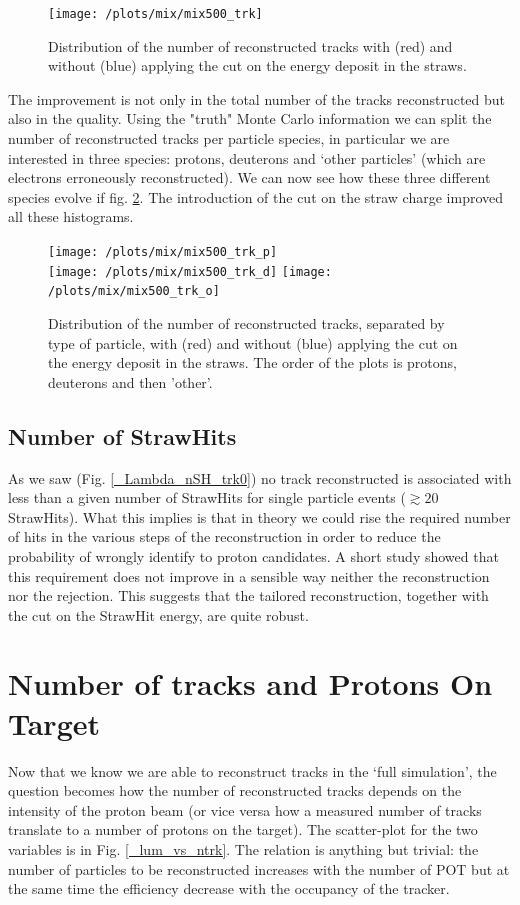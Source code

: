 \documentclass[12pt,a4paper,openright, oneside, titlepage]{book} %
\begin{document}
\begin{figure}[!htb]
\centering
\texttt{[image: /plots/mix/mix500\_trk]}
\caption[Number of tracks with and without the cut on the StrawHit energy]
{Distribution of the number of reconstructed tracks with (red) and without (blue) 
applying the cut on the energy deposit in the straws.}
\label{_mix_proton_trk}
\end{figure}

\noindent The improvement is not only in the total number of the tracks reconstructed but also in the quality. 
Using the "truth" Monte Carlo information we can split the number of reconstructed tracks per particle species, 
in particular we are interested in three species: protons, deuterons and `other particles' (which are electrons erroneously reconstructed).
We can now see how these three different species evolve if fig. \ref{_mix_pdgID_trk}.
The introduction of the cut on the straw charge improved all these histograms.

\begin{figure}[!htb]
\centering
\texttt{[image: /plots/mix/mix500\_trk\_p]}\\
\texttt{[image: /plots/mix/mix500\_trk\_d]}
\texttt{[image: /plots/mix/mix500\_trk\_o]}
\caption[Number of tracks from different particles]
{Distribution of the number of reconstructed tracks, separated by type of particle, with (red) and without (blue) applying the cut on the energy deposit in the straws. The order of the plots is protons, deuterons and then 'other'.}
\label{_mix_pdgID_trk}
\end{figure}

\subsection{Number of StrawHits}
As we saw (Fig. \ref{_Lambda_nSH_trk0}) no track reconstructed is associated with less than a given number of StrawHits for single particle events ($\gtrsim 20$ StrawHits). 
What this implies is that in theory we could rise the required number of hits in the various steps of the reconstruction in order to reduce the probability of wrongly identify to proton candidates.
A short study showed that this requirement does not improve in a sensible way neither the reconstruction nor the rejection. 
This suggests that the tailored reconstruction, together with the cut on the StrawHit energy, are quite robust.\\

\section{Number of tracks and Protons On Target}
Now that we know we are able to reconstruct tracks in the `full simulation', the question becomes how the number of reconstructed tracks depends on the intensity of the proton beam (or vice versa how a measured number of tracks translate to a number of protons on the target).
The scatter-plot for the two variables is in Fig. \ref{_lum_vs_ntrk}.
The relation is anything but trivial: the number of particles to be reconstructed increases with the number of POT but at the same time the efficiency decrease with the occupancy of the tracker.\\
\end{document}
